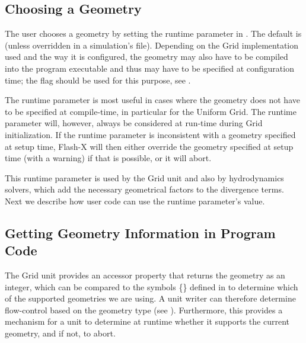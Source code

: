 \subsection{Choosing a Geometry}

The user chooses a geometry by setting the
runtime parameter in . The default is
 (unless overridden in a simulation's  file).
Depending on the \unit{Grid} implementation used and the way it is
configured, the geometry may also have to be compiled into the program
executable and thus may have to be specified at configuration
time;
the  flag 
should be used for this purpose, see .


The  runtime parameter is most useful
in cases where the geometry does not have to be specified
at compile-time, in particular for the Uniform Grid.
The runtime parameter will, however, always be considered
at run-time during \unit{Grid} initialization.
If the  runtime parameter is inconsistent
with a geometry specified at setup time,
Flash-X will then either
override the geometry specified at setup time (with a warning)
if that is possible, or it will abort.

This runtime parameter is used by the \unit{Grid} unit and
also by hydrodynamics solvers, which add the
necessary geometrical factors to the divergence terms.
Next we describe how user code can use the runtime parameter's value.

\subsection[Geometry Information in Code]{Getting Geometry Information in Program Code}
The \unit{Grid} unit provides an accessor
 property that returns
the geometry as an integer, which can be compared to the symbols
\{\}
defined in  to determine
which of the supported geometries we are using.  A unit writer can
therefore determine flow-control based on the geometry type (see
). Furthermore, this provides a mechanism
for a unit to determine at runtime whether it supports the current
geometry, and if not, to abort.

